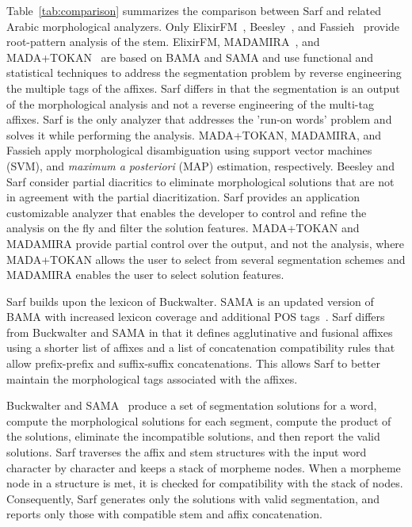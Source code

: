 Table~\ref{tab:comparison} summarizes the comparison between Sarf 
and related Arabic morphological analyzers. 
Only ElixirFM~\citep{Otakar:07}, Beesley~\citep*{Beesley:03}, and Fassieh~\citep*{attia2009fassieh} 
provide root-pattern analysis of the stem. 
ElixirFM, MADAMIRA~\citep{pasha2014madamira}, and MADA+TOKAN~\citep*{Habash:09} are 
based on BAMA and SAMA and use functional and statistical techniques to 
address the segmentation problem by reverse engineering the multiple tags of the 
affixes. 
Sarf differs in that the segmentation is an output of the morphological
analysis and not a reverse engineering of the multi-tag affixes. 
Sarf is the only analyzer that addresses the 'run-on words' problem 
and solves it while performing the analysis. 
MADA+TOKAN, MADAMIRA, and Fassieh apply morphological disambiguation 
using support vector machines (SVM), 
and {\em maximum a posteriori} (MAP) estimation, respectively.
Beesley and Sarf consider partial diacritics to eliminate morphological 
solutions that are not in agreement with the partial diacritization. 
Sarf provides an application customizable analyzer that enables 
the developer to control and refine the analysis on the fly 
and filter the solution features. 
MADA+TOKAN and MADAMIRA provide  partial control over the output, and not the 
analysis, where MADA+TOKAN allows the user to select  from several segmentation schemes and 
MADAMIRA enables the user to select solution features.

Sarf builds upon the lexicon of Buckwalter\citep{Buckwalter:02}.
SAMA is an updated version of BAMA with increased lexicon coverage 
and additional POS tags~\citep*{maamouri2010ldc}.
Sarf differs from Buckwalter and SAMA in that it defines 
agglutinative and fusional affixes using a shorter list of affixes
and a list of concatenation compatibility rules that allow 
prefix-prefix and suffix-suffix concatenations.
This allows Sarf to better maintain %
the morphological tags associated with the affixes. 

Buckwalter\citep{Buckwalter:02} and SAMA~\citep{Maamouri:10} 
produce a set of segmentation solutions for
a word, compute the morphological solutions for each segment, 
compute the product of the solutions, eliminate  the 
incompatible solutions, and then report  the valid solutions. 
Sarf traverses the affix and stem structures with the input word
character by character and keeps a stack of morpheme nodes. 
When a morpheme node in a structure is met, 
it is checked for compatibility with the stack of nodes. 
Consequently, Sarf generates only the solutions with valid 
segmentation, and reports only those with compatible stem and affix 
concatenation. 


